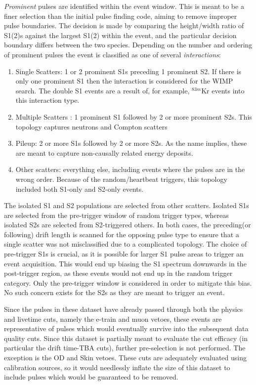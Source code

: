 \textit{Prominent} pulses are identified within the event window.
This is meant to be a finer selection than the initial pulse finding code, aiming to remove improper pulse boundaries.
The decision is made by comparing the height/width ratio of S1(2)s against the largest S1(2) within the event, and the particular decision boundary differs between the two species.
Depending on the number and ordering of prominent pulses the event is classified as one of several \textit{interactions}:
\begin{enumerate}
    \item Single Scatters: 1 or 2 prominent S1s preceding 1 prominent S2. If there is only one prominent S1 then the interaction is considered for the WIMP search. The double S1 events are a result of, for example, $^{83m}$Kr events into this interaction type.
    \item Multiple Scatters : 1 prominent S1 followed by 2 or more prominent S2s. This topology captures neutrons and Compton scatters
    \item Pileup: 2 or more S1s followed by 2 or more S2s. As the name implies, these are meant to capture non-causally related energy deposits.
    \item Other scatters: everything else, including events where the pulses are in the wrong order. Because of the random/heartbeat triggers, this topology included both S1-only and S2-only events.
\end{enumerate}

The isolated S1 and S2 populations are selected from other scatters. 
Isolated S1s are selected from the pre-trigger window of random trigger types, whereas isolated S2s are selected from S2-triggered others.
In both cases, the preceding(or following) drift length is scanned for the opposing pulse type to ensure that a single scatter was not misclassified due to a complicated topology.
The choice of pre-trigger S1s is crucial, as it is possible for larger S1 pulse areas to trigger an event acquisition. 
This would end up biasing the S1 spectrum downwards in the post-trigger region, as these events would not end up in the random trigger category.
Only the pre-trigger window is considered in order to mitigate this bias.
No such concern exists for the S2s as they are meant to trigger an event.

Since the pulses in these dataset have already passed through both the physics and livetime cuts, namely the e-train and muon vetoes, these events are representative of pulses which would eventually survive into the subsequent data quality cuts.
Since this dataset is partially meant to evaluate the cut efficacy (in particular the drift time-TBA cuts), further pre-selection is not performed.
The exception is the OD and Skin vetoes.
These cuts are adequately evaluated using calibration sources, so it would needlessly inflate the size of this dataset to include pulses which would be guaranteed to be removed.



